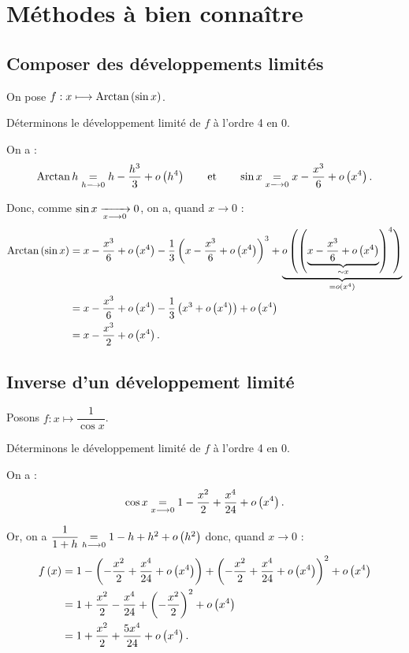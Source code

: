 \section{Méthodes à bien connaître}

\subsection{Composer des développements limités}

\begin{ex}
On pose \(f:x\longmapsto\operatorname{Arctan}\left(\sin x\right)\).

Déterminons le développement limité de \(f\) à l'ordre 4 en \(0\).

On a : \[\operatorname{Arctan} h\underset{h\longrightarrow0}{=}h-\dfrac{h^3}{3}+o\left(h^4\right)\qquad\text{et}\qquad\sin x\underset{x\longrightarrow0}{=}x-\dfrac{x^3}{6}+o\left(x^4\right).\]

Donc, comme \(\sin x\xrightarrow[x\longrightarrow0]{}0\), on a, quand \(x\to0\) : \[\begin{aligned}
\operatorname{Arctan}\left(\sin x\right)&=x-\dfrac{x^3}{6}+o\left(x^4\right)-\dfrac{1}{3}\left(x-\dfrac{x^3}{6}+o\left(x^4\right)\right)^3+\underbrace{o\left(\left(\underbrace{x-\dfrac{x^3}{6}+o\left(x^4\right)}_{\sim x}\right)^4\right)}_{=o\left(x^4\right)} \\
&=x-\dfrac{x^3}{6}+o\left(x^4\right)-\dfrac{1}{3}\left(x^3+o\left(x^4\right)\right)+o\left(x^4\right) \\
&=x-\dfrac{x^3}{2}+o\left(x^4\right).
\end{aligned}\]
\end{ex}

\subsection{Inverse d'un développement limité}

\begin{ex}
Posons \(f:x\mapsto\dfrac{1}{\cos x}\).

Déterminons le développement limité de \(f\) à l'ordre 4 en \(0\).

On a : \[\cos x\underset{x\longrightarrow0}{=}1-\dfrac{x^2}{2}+\dfrac{x^4}{24}+o\left(x^4\right).\]

Or, on a \(\dfrac{1}{1+h}\underset{h\longrightarrow0}{=}1-h+h^2+o\left(h^2\right)\) donc, quand \(x\to0\) : \[\begin{aligned}
f\left(x\right)&=1-\left(-\dfrac{x^2}{2}+\dfrac{x^4}{24}+o\left(x^4\right)\right)+\left(-\dfrac{x^2}{2}+\dfrac{x^4}{24}+o\left(x^4\right)\right)^2+o\left(x^4\right) \\
&=1+\dfrac{x^2}{2}-\dfrac{x^4}{24}+\left(-\dfrac{x^2}{2}\right)^2+o\left(x^4\right) \\
&=1+\dfrac{x^2}{2}+\dfrac{5x^4}{24}+o\left(x^4\right).
\end{aligned}\]
\end{ex}

